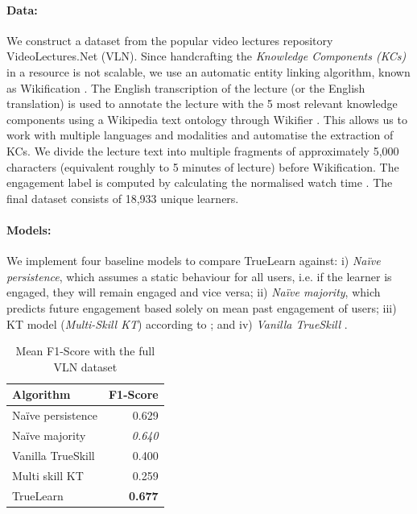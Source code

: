 \documentclass[letterpaper]{article} %
\begin{document}
\paragraph{Data:} We construct a dataset from the popular video lectures repository VideoLectures.Net (VLN). Since handcrafting the \emph{Knowledge Components (KCs)} in a resource is not scalable, we use an automatic entity linking algorithm, known as Wikification \cite{wikifier}.  The English transcription of the lecture (or the English translation) is used to annotate the lecture with the 5 most relevant knowledge components using a Wikipedia text ontology through Wikifier \cite{wikifier}. This allows us to work with multiple languages and modalities and automatise the extraction of KCs. We divide the lecture text into multiple fragments of approximately 5,000 characters (equivalent roughly to 5 minutes of lecture) before Wikification. The engagement label is computed by calculating the normalised watch time \cite{Guo_vid_prod}. The final dataset consists of 18,933 unique learners.


\paragraph{Models:} We implement four baseline models to compare TrueLearn against: i) \emph{Na\"ive persistence}, which assumes a static behaviour for all users, i.e. if the learner is engaged, they will remain engaged and vice versa; ii) \emph{Na\"ive majority}, which predicts future engagement based solely on mean past engagement of users; iii) KT model (\emph{Multi-Skill KT}) according to \cite{bishopsnewbook}; and iv) \emph{Vanilla TrueSkill} \cite{trueskill}.%



\begin{table}[!h]
  \caption{Mean F1-Score with the full VLN dataset}
  \label{tab:truelearn_performance}
  \centering
  \begin{tabular}{l r}  \toprule
    Algorithm
    & F1-Score \\  \hline

    Na\"ive persistence
    & 0.629 \\
    Na\"ive majority
    & \textit{0.640} \\
    Vanilla TrueSkill
    & 0.400 \\
    Multi skill KT
    & 0.259 \\
    TrueLearn
    & \textbf{0.677} \\
    \hline
  \end{tabular}
\end{table}
\end{document}
